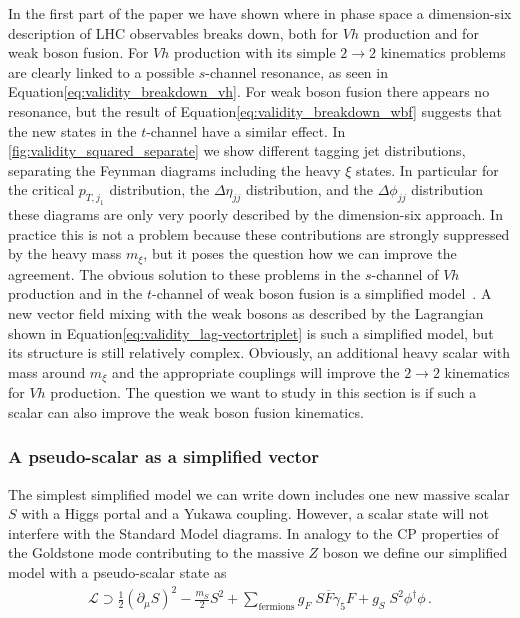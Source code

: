 In the first part of the paper we have shown where in phase space a
dimension-six description of LHC observables breaks down, both for $Vh$
production and for weak boson fusion. For $Vh$ production with its
simple $2 \to 2$ kinematics problems are clearly linked to a possible
$s$-channel resonance, as seen in Equation\;\eqref{eq:validity_breakdown_vh}.  For
weak boson fusion there appears no resonance, but the result of
Equation\;\eqref{eq:validity_breakdown_wbf} suggests that the new states in the
$t$-channel have a similar effect.  In \autoref{fig:validity_squared_separate}
we show different tagging jet distributions, separating the Feynman
diagrams including the heavy $\xi$ states. In particular for the
critical $p_{T,j_1}$ distribution, the $\Delta \eta_{jj}$
distribution, and the $\Delta \phi_{jj}$ distribution these diagrams
are only very poorly described by the dimension-six approach. In
practice this is not a problem because these contributions are
strongly suppressed by the heavy mass $m_\xi$, but it poses the
question how we can improve the agreement. The obvious solution to
these problems in the $s$-channel of $Vh$ production and in the
$t$-channel of weak boson fusion is a simplified
model~\cite{simp,simp_higgs}. A new vector field mixing with the weak
bosons as described by the Lagrangian shown in
Equation\;\eqref{eq:validity_lag-vectortriplet} is such a simplified model, but its
structure is still relatively complex. Obviously, an additional heavy
scalar with mass around $m_\xi$ and the appropriate couplings will
improve the $2 \to 2$ kinematics for $Vh$ production. The question we
want to study in this section is if such a scalar can also improve the
weak boson fusion kinematics.



\subsubsection*{A pseudo-scalar as a simplified vector}

The simplest simplified model we can write down includes one new
massive scalar $S$ with a Higgs portal and a Yukawa coupling. 
However, a scalar state will not interfere with the Standard Model
diagrams. In analogy to the CP properties of the Goldstone mode
contributing to the massive $Z$ boson we define our simplified model
with a pseudo-scalar state as
%
\begin{align}
\mathcal{L} \supset 
  \frac{1}{2} (\partial_\mu S)^2 
- \frac{m_S}{2} S^2 
+ \sum_\text{fermions} g_F \; S \overline{F} \gamma_5 F 
+ g_S \; S^2 \phi^\dagger \phi \,.
  \label{eq:validity_simplified_model}
\end{align}


